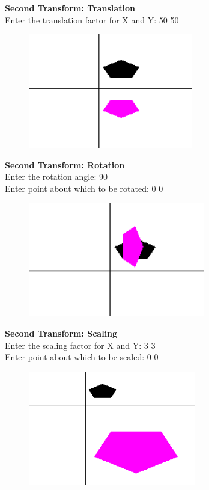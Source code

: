 \documentclass[9pt,letterpaper]{article}
\begin{document}
\textbf{\large{Second Transform: Translation}}\\
Enter the translation factor for X and Y: 50 50 \\

\begin{figure}[h]
    \centering
    \includegraphics[height=5cm]{CompositeTransformations/Outputs/ReflectTranslate.png}
\end{figure}

\newpage

\textbf{\large{Second Transform: Rotation}}\\
Enter the rotation angle: 90 \\
Enter point about which to be rotated: 0 0\\

\begin{figure}[h]
    \centering
    \includegraphics[height=5cm]{CompositeTransformations/Outputs/ReflectRotate.png}
\end{figure}

\textbf{\large{Second Transform: Scaling}}\\
Enter the scaling factor for X and Y: 3 3\\
Enter point about which to be scaled: 0 0\\

\begin{figure}[h]
    \centering
    \includegraphics[height=5cm]{CompositeTransformations/Outputs/ReflectScale.png}
\end{figure}
\end{document}
